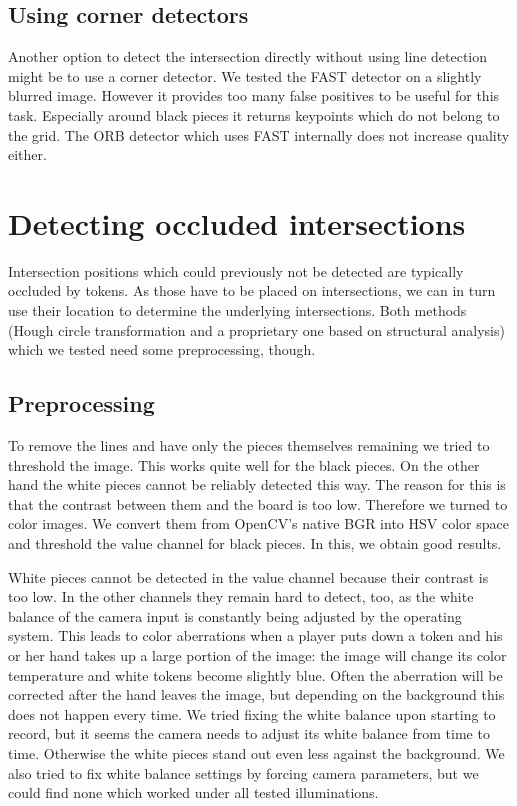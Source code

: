 	\subsection{Using corner detectors}
	\label{detector-visible-corners}
	Another option to detect the intersection directly without using line detection might be to use a corner detector. We tested the FAST \cite{rosten2006machine} detector on a slightly blurred image. However it provides too many false positives to be useful for this task. Especially around black pieces it returns keypoints which do not belong to the grid. The ORB detector which uses FAST internally does not increase quality either.

	\section{Detecting occluded intersections}
	\label{detector-occluded}
	Intersection positions which could previously not be detected are typically occluded by tokens. As those have to be placed on intersections, we can in turn use their location to determine the underlying intersections. Both methods (Hough circle transformation and a proprietary one based on structural analysis) which we tested need some preprocessing, though.

	\subsection{Preprocessing}
	\label{detector-occluded-preprocessing}
	To remove the lines and have only the pieces themselves remaining we tried to threshold the image. This works quite well for the black pieces. On the other hand the white pieces cannot be reliably detected this way. The reason for this is that the contrast between them and the board is too low. Therefore we turned to color images. We convert them from OpenCV's native BGR into HSV color space and threshold the value channel for black pieces. In this, we obtain good results.

	White pieces cannot be detected in the value channel because their contrast is too low. In the other channels they remain hard to detect, too, as the white balance of the camera input is constantly being adjusted by the operating system. This leads to color aberrations when a player puts down a token and his or her hand takes up a large portion of the image: the image will change its color temperature and white tokens become slightly blue. Often the aberration will be corrected after the hand leaves the image, but depending on the background this does not happen every time. We tried fixing the white balance upon starting to record, but it seems the camera needs to adjust its white balance from time to time. Otherwise the white pieces stand out even less against the background. We also tried to fix white balance settings by forcing camera parameters, but we could find none which worked under all tested illuminations.

